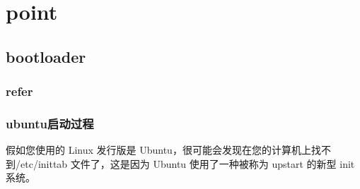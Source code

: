 \documentclass[a4paper,10pt,english]{sphinxmanual}
\begin{document}
\section{point}
\label{\detokenize{linux/point::doc}}\label{\detokenize{linux/point:point}}

\subsection{bootloader}
\label{\detokenize{linux/point:bootloader}}

\subsubsection{refer}
\label{\detokenize{linux/point:refer}}


\subsubsection{ubuntu启动过程}
\label{\detokenize{linux/point:ubuntu}}
假如您使用的 Linux 发行版是 Ubuntu，很可能会发现在您的计算机上找不到/etc/inittab 文件了，这是因为 Ubuntu 使用了一种被称为 upstart 的新型 init 系统。
\end{document}
